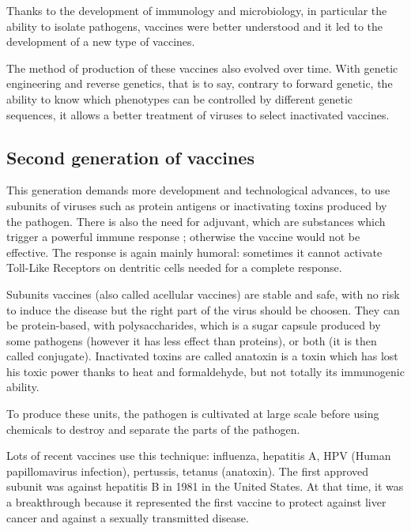 \documentclass{article}
\begin{document}

            Thanks to the development of immunology and microbiology, in particular the ability to isolate pathogens, vaccines were better understood
                and it led to the development of a new type of vaccines.

            The method of production of these vaccines also evolved over time. With genetic engineering and reverse genetics, that is to say,  
                contrary to forward genetic, the ability to know which phenotypes can be controlled by different genetic sequences,
                it allows a better treatment of viruses to select inactivated vaccines.

        \subsection{Second generation of vaccines}


            This generation demands more development and technological advances,
                to use subunits of viruses such as protein antigens or inactivating toxins produced by the pathogen. %
            There is also the need for adjuvant, which are substances which trigger a powerful immune response ; otherwise the vaccine would not be effective. 
            The response is again mainly humoral: sometimes it cannot activate Toll-Like Receptors on dentritic cells needed for a complete response.

            Subunits vaccines (also called acellular vaccines) are stable and safe, with no risk to induce the disease but the right part of the virus should be choosen.
                They can be protein-based, with polysaccharides, which is a sugar capsule produced by some pathogens (however it has less effect than proteins), or both (it is then called conjugate).
            Inactivated toxins are called anatoxin is a toxin which has lost his toxic power thanks to heat and formaldehyde, but not totally its immunogenic ability.

            To produce these units, the pathogen is cultivated at large scale before using chemicals to destroy and separate the parts of the pathogen.

            Lots of recent vaccines use this technique: influenza, hepatitis A, HPV (Human papillomavirus infection), pertussis, tetanus (anatoxin). 
                The first approved subunit was against hepatitis B in 1981 in the United States. 
                At that time, it was a breakthrough because it represented the first vaccine to protect against liver cancer and against a sexually transmitted disease.
\end{document}
